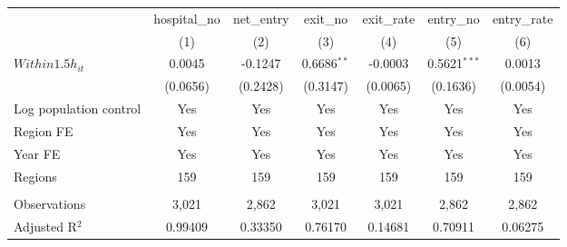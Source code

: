 \begingroup
\centering
\begin{tabular}{lcccccc}
   \toprule
                          & hospital\_no  & net\_entry  & exit\_no      & exit\_rate  & entry\_no      & entry\_rate \\    
                          & (1)           & (2)         & (3)           & (4)         & (5)            & (6)\\  
   \midrule 
   $Within1.5h_{it}$      & 0.0045        & -0.1247     & 0.6686$^{**}$ & -0.0003     & 0.5621$^{***}$ & 0.0013\\   
                          & (0.0656)      & (0.2428)    & (0.3147)      & (0.0065)    & (0.1636)       & (0.0054)\\   
   Log population control & Yes           & Yes         & Yes           & Yes         & Yes            & Yes\\  
   Region FE              & Yes           & Yes         & Yes           & Yes         & Yes            & Yes\\  
   Year FE                & Yes           & Yes         & Yes           & Yes         & Yes            & Yes\\  
   Regions                & 159           & 159         & 159           & 159         & 159            & 159\\  
    \\
   Observations           & 3,021         & 2,862       & 3,021         & 3,021       & 2,862          & 2,862\\  
   Adjusted R$^2$         & 0.99409       & 0.33350     & 0.76170       & 0.14681     & 0.70911        & 0.06275\\  
   \bottomrule
\end{tabular}
\par\endgroup
